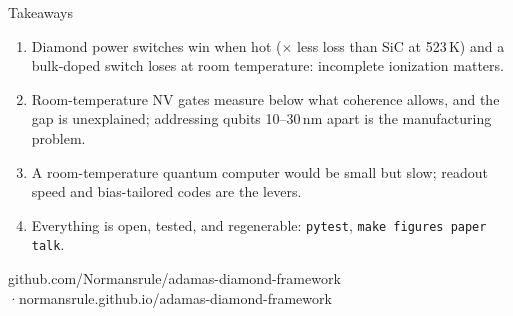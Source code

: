 \documentclass[aspectratio=169,11pt]{beamer}
\begin{document}
\begin{frame}{Takeaways}
\begin{enumerate}
\item Diamond power switches \alert{win when hot} (\PowerRatioHot$\times$ less loss than SiC at 523\,K) and a bulk-doped switch loses at room temperature: incomplete ionization matters.
\item Room-temperature NV gates measure below what coherence allows, and \alert{the gap is unexplained}; addressing qubits 10--30\,nm apart is the manufacturing problem.
\item A room-temperature quantum computer would be \alert{small but slow}; readout speed and bias-tailored codes are the levers.
\item Everything is open, tested, and regenerable: \texttt{pytest}, \texttt{make figures paper talk}.
\end{enumerate}
\vspace{.8em}\centering\small github.com/Normansrule/adamas-diamond-framework \quad·\quad normansrule.github.io/adamas-diamond-framework
\end{frame}
\end{document}
